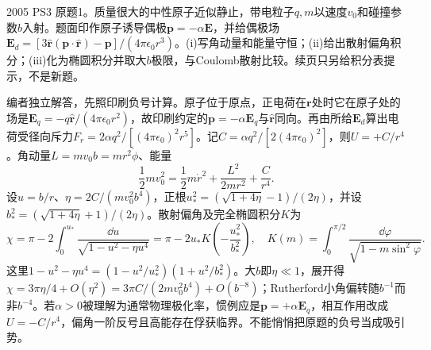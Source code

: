 \begin{exercise}\label{ex:hist05-3-1}
2005 PS3 原题1。质量很大的中性原子近似静止，带电粒子$q,m$以速度$v_0$和碰撞参数$b$入射。题面印作原子诱导偶极$\mathbf p=-\alpha\mathbf E$，并给偶极场$\mathbf E_d=[3\hat{\mathbf r}(\mathbf p\cdot\hat{\mathbf r})-\mathbf p]/(4\pi\epsilon_0r^3)$。(i)写角动量和能量守恒；(ii)给出散射偏角积分；(iii)化为椭圆积分并取大$b$极限，与Coulomb散射比较。续页只另给积分表提示，不是新题。
\end{exercise}
\begin{solution}
编者独立解答，先照印刷负号计算。原子位于原点，正电荷在$\mathbf r$处时它在原子处的场是$\mathbf E_q=-q\hat{\mathbf r}/(4\pi\epsilon_0r^2)$，故印刷约定的$\mathbf p=-\alpha\mathbf E_q$与$\hat{\mathbf r}$同向。再由所给$\mathbf E_d$算出电荷受径向斥力$F_r=2\alpha q^2/[(4\pi\epsilon_0)^2r^5]$。记$C=\alpha q^2/[2(4\pi\epsilon_0)^2]$，则$U=+C/r^4$。角动量$L=mv_0b=mr^2\dot\phi$、能量
\begin{equation}\frac12mv_0^2=\frac12m\dot r^2+\frac{L^2}{2mr^2}+\frac{C}{r^4}.\end{equation}
设$u=b/r$、$\eta=2C/(mv_0^2b^4)$，正根$u_*^2=(\sqrt{1+4\eta}-1)/(2\eta)$，并设$b_*^2=(\sqrt{1+4\eta}+1)/(2\eta)$。散射偏角及完全椭圆积分$K$为
\begin{equation}
\chi=\pi-2\int_0^{u_*}\frac{\dd u}{\sqrt{1-u^2-\eta u^4}}
=\pi-2u_*K\!\left(-\frac{u_*^2}{b_*^2}\right),\quad
K(m)=\int_0^{\pi/2}\frac{\dd\varphi}{\sqrt{1-m\sin^2\varphi}}.
\end{equation}
这里$1-u^2-\eta u^4=(1-u^2/u_*^2)(1+u^2/b_*^2)$。大$b$即$\eta\ll1$，展开得$\chi=3\pi\eta/4+O(\eta^2)=3\pi C/(2mv_0^2b^4)+O(b^{-8})$；Rutherford小角偏转随$b^{-1}$而非$b^{-4}$。若$\alpha>0$被理解为通常物理极化率，惯例应是$\mathbf p=+\alpha\mathbf E_q$，相互作用改成$U=-C/r^4$，偏角一阶反号且高能存在俘获临界。不能悄悄把原题的负号当成吸引势。
\end{solution}

